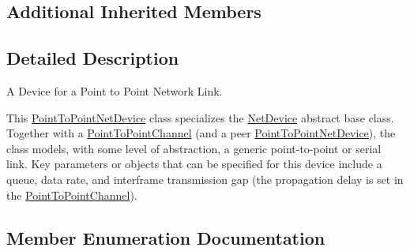 \subsection*{Additional Inherited Members}


\subsection{Detailed Description}
A Device for a Point to Point Network Link. 

This \hyperlink{classns3_1_1PointToPointNetDevice}{Point\+To\+Point\+Net\+Device} class specializes the \hyperlink{classns3_1_1NetDevice}{Net\+Device} abstract base class. Together with a \hyperlink{classns3_1_1PointToPointChannel}{Point\+To\+Point\+Channel} (and a peer \hyperlink{classns3_1_1PointToPointNetDevice}{Point\+To\+Point\+Net\+Device}), the class models, with some level of abstraction, a generic point-\/to-\/point or serial link. Key parameters or objects that can be specified for this device include a queue, data rate, and interframe transmission gap (the propagation delay is set in the \hyperlink{classns3_1_1PointToPointChannel}{Point\+To\+Point\+Channel}). 

\subsection{Member Enumeration Documentation}
